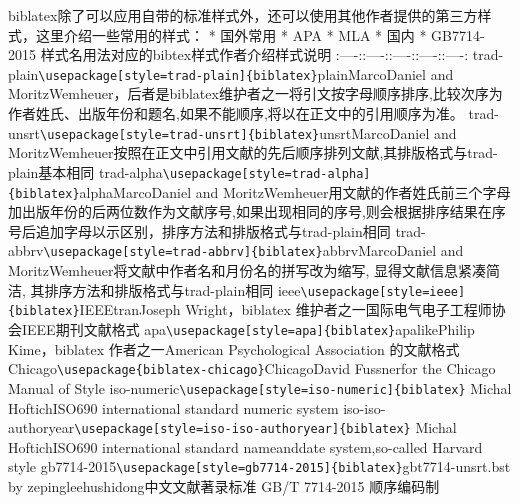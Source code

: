 biblatex除了可以应用自带的标准样式外，还可以使用其他作者提供的第三方样式，这里介绍一些常用的样式：
* 国外常用 * APA * MLA * 国内 * GB7714-2015
样式名\textbar{}用法\textbar{}对应的bibtex样式\textbar{}作者介绍\textbar{}样式说明\textbar{}
:----:\textbar{}:----:\textbar{}:----:\textbar{}:----:\textbar{}:----:\textbar{}
trad-plain\textbar{}\texttt{\textbackslash{}usepackage{[}style=trad-plain{]}\{biblatex\}}\textbar{}plain\textbar{}MarcoDaniel
and
MoritzWemheuer，后者是biblatex维护者之一\textbar{}将引文按字母顺序排序,比较次序为作者姓氏、出版年份和题名,如果不能顺序,将以在正文中的引用顺序为准。\textbar{}
trad-unsrt\textbar{}\texttt{\textbackslash{}usepackage{[}style=trad-unsrt{]}\{biblatex\}}\textbar{}unsrt\textbar{}MarcoDaniel
and
MoritzWemheuer\textbar{}按照在正文中引用文献的先后顺序排列文献,其排版格式与trad-plain基本相同\textbar{}
trad-alpha\textbar{}\texttt{\textbackslash{}usepackage{[}style=trad-alpha{]}\{biblatex\}}\textbar{}alpha\textbar{}MarcoDaniel
and
MoritzWemheuer\textbar{}用文献的作者姓氏前三个字母加出版年份的后两位数作为文献序号,如果出现相同的序号,则会根据排序结果在序号后追加字母以示区别，排序方法和排版格式与trad-plain相同\textbar{}
trad-abbrv\textbar{}\texttt{\textbackslash{}usepackage{[}style=trad-abbrv{]}\{biblatex\}}\textbar{}abbrv\textbar{}MarcoDaniel
and MoritzWemheuer\textbar{}将文献中作者名和月份名的拼写改为缩写,
显得文献信息紧凑简洁, 其排序方法和排版格式与trad-plain相同\textbar{}
ieee\textbar{}\texttt{\textbackslash{}usepackage{[}style=ieee{]}\{biblatex\}}\textbar{}IEEEtran\textbar{}Joseph
Wright，biblatex
维护者之一\textbar{}国际电气电子工程师协会IEEE期刊文献格式\textbar{}
apa\textbar{}\texttt{\textbackslash{}usepackage{[}style=apa{]}\{biblatex\}}\textbar{}apalike\textbar{}Philip
Kime，biblatex 作者之一\textbar{}American Psychological Association
的文献格式\textbar{}
Chicago\textbar{}\texttt{\textbackslash{}usepackage\{biblatex-chicago\}}\textbar{}Chicago\textbar{}David
Fussner\textbar{}for the Chicago Manual of Style\textbar{}
iso-numeric\textbar{}\texttt{\textbackslash{}usepackage{[}style=iso-numeric{]}\{biblatex\}}\textbar{}
\textbar{}Michal Hoftich\textbar{}ISO690 international standard numeric
system\textbar{}
iso-iso-authoryear\textbar{}\texttt{\textbackslash{}usepackage{[}style=iso-iso-authoryear{]}\{biblatex\}}\textbar{}
\textbar{}Michal Hoftich\textbar{}ISO690 international standard
nameanddate system,so-called Harvard style\textbar{}
gb7714-2015\textbar{}\texttt{\textbackslash{}usepackage{[}style=gb7714-2015{]}\{biblatex\}}\textbar{}gbt7714-unsrt.bst
by zepinglee\textbar{}hushidong\textbar{}中文文献著录标准 GB/T 7714-2015
顺序编码制\textbar{}
